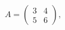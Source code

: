 \documentclass[preview]{standalone}
\begin{document}
\begin{align*}
A = \begin{pmatrix} 3 & 4 \\ 5 & 6 \end{pmatrix}, \quad
\end{align*}
\end{document}
